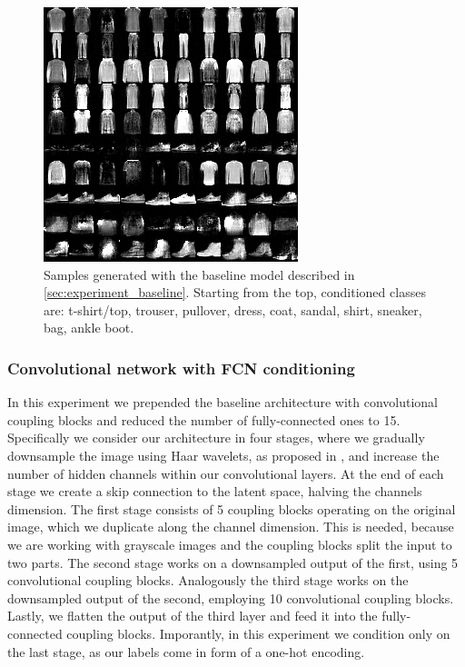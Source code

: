 \documentclass[final]{cvpr}
\begin{document}
\begin{figure}[t]
	\begin{center}
		\includegraphics[width=0.8\linewidth]{./figs/fashion_mnist/baseline_model_samples.png}
	\end{center}
	\caption{Samples generated with the baseline model described in \ref{sec:experiment_baseline}. Starting from the top, conditioned classes are: t-shirt/top, trouser, pullover, dress, coat, sandal, shirt, sneaker, bag, ankle boot.}
	\label{fig:fashionmnist_baseline_samples}
\end{figure}


\subsubsection{Convolutional network with FCN conditioning}
In this experiment we prepended the baseline architecture with convolutional coupling blocks and reduced the number of fully-connected ones to 15. Specifically we consider our architecture in four stages, where we gradually downsample the image using Haar wavelets, as proposed in \cite{main_paper_CINN}, and increase the number of hidden channels within our convolutional layers. At the end of each stage we create a skip connection to the latent space, halving the channels dimension. The first stage consists of 5 coupling blocks operating on the original image, which we duplicate along the channel dimension. This is needed, because we are working with grayscale images and the coupling blocks split the input to two parts. The second stage works on a downsampled output of the first, using 5 convolutional coupling blocks. Analogously the third stage works on the downsampled output of the second, employing 10 convolutional coupling blocks. Lastly, we flatten the output of the third layer and feed it into the fully-connected coupling blocks. Imporantly, in this experiment we condition only on the last stage, as our labels come in form of a one-hot encoding.
\end{document}
